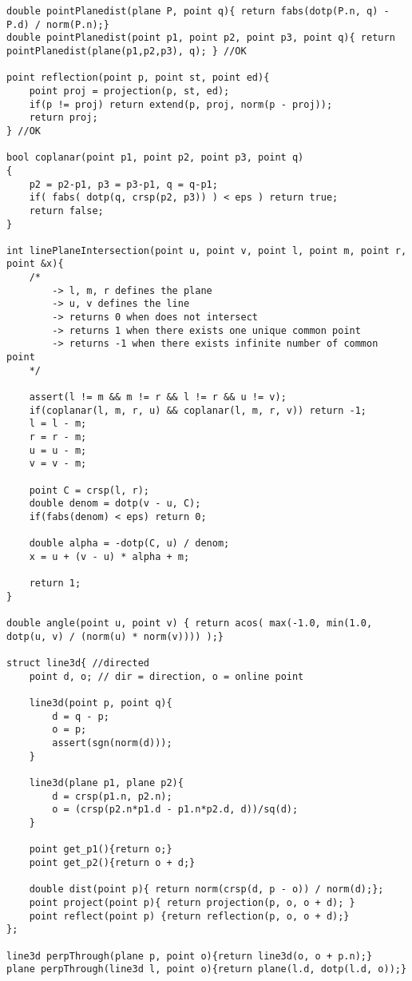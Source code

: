 \documentclass[10pt,a4paper,onesided]{article}
\begin{document}
\begin{multicols*}{3}
\begin{lstlisting}
double pointPlanedist(plane P, point q){ return fabs(dotp(P.n, q) - P.d) / norm(P.n);}
double pointPlanedist(point p1, point p2, point p3, point q){ return pointPlanedist(plane(p1,p2,p3), q); } //OK

point reflection(point p, point st, point ed){
    point proj = projection(p, st, ed);
    if(p != proj) return extend(p, proj, norm(p - proj));
    return proj;
} //OK

bool coplanar(point p1, point p2, point p3, point q)
{
    p2 = p2-p1, p3 = p3-p1, q = q-p1;
    if( fabs( dotp(q, crsp(p2, p3)) ) < eps ) return true;
    return false;
}

int linePlaneIntersection(point u, point v, point l, point m, point r, point &x){
    /*
        -> l, m, r defines the plane
        -> u, v defines the line
        -> returns 0 when does not intersect
        -> returns 1 when there exists one unique common point
        -> returns -1 when there exists infinite number of common point
    */

    assert(l != m && m != r && l != r && u != v);
    if(coplanar(l, m, r, u) && coplanar(l, m, r, v)) return -1;
    l = l - m;
    r = r - m;
    u = u - m;
    v = v - m;

    point C = crsp(l, r);
    double denom = dotp(v - u, C);
    if(fabs(denom) < eps) return 0;

    double alpha = -dotp(C, u) / denom;
    x = u + (v - u) * alpha + m;

    return 1;
}

double angle(point u, point v) { return acos( max(-1.0, min(1.0, dotp(u, v) / (norm(u) * norm(v)))) );}

struct line3d{ //directed
    point d, o; // dir = direction, o = online point

    line3d(point p, point q){
        d = q - p;
        o = p;
        assert(sgn(norm(d)));
    }

    line3d(plane p1, plane p2){
        d = crsp(p1.n, p2.n);
        o = (crsp(p2.n*p1.d - p1.n*p2.d, d))/sq(d);
    }

    point get_p1(){return o;}
    point get_p2(){return o + d;}

    double dist(point p){ return norm(crsp(d, p - o)) / norm(d);};
    point project(point p){ return projection(p, o, o + d); }
    point reflect(point p) {return reflection(p, o, o + d);}
};

line3d perpThrough(plane p, point o){return line3d(o, o + p.n);}
plane perpThrough(line3d l, point o){return plane(l.d, dotp(l.d, o));}


\end{lstlisting}
\end{multicols*}
\end{document}

